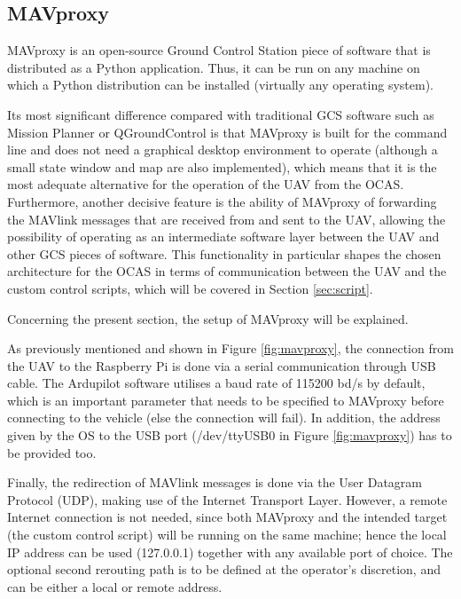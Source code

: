 \subsection{MAVproxy} \label{sec:mavproxy}

MAVproxy is an open-source Ground Control Station piece of software that is distributed as a Python application.
Thus, it can be run on any machine on which a Python distribution can be installed (virtually any operating system).

Its most significant difference compared with traditional GCS software such as Mission Planner or QGroundControl is that MAVproxy is built for the command line and does not need a graphical desktop environment to operate (although a small state window and map are also implemented), which means that it is the most adequate alternative for the operation of the UAV from the OCAS.
Furthermore, another decisive feature is the ability of MAVproxy of forwarding the MAVlink messages that are received from and sent to the UAV, allowing the possibility of operating as an intermediate software layer between the UAV and other GCS pieces of software.
This functionality in particular shapes the chosen architecture for the OCAS in terms of communication between the UAV and the custom control scripts, which will be covered in Section \ref{sec:script}.

Concerning the present section, the setup of MAVproxy will be explained.



As previously mentioned and shown in Figure \ref{fig:mavproxy}, the connection from the UAV to the Raspberry Pi is done via a serial communication through USB cable.
The Ardupilot software utilises a baud rate of 115200 bd/s by default, which is an important parameter that needs to be specified to MAVproxy before connecting to the vehicle (else the connection will fail).
In addition, the address given by the OS to the USB port (/dev/ttyUSB0 in Figure \ref{fig:mavproxy}) has to be provided too. 

Finally, the redirection of MAVlink messages is done via the User Datagram Protocol (UDP), making use of the Internet Transport Layer.
However, a remote Internet connection is not needed, since both MAVproxy and the intended target (the custom control script) will be running on the same machine; hence the local IP address can be used (127.0.0.1) together with any available port of choice.
The optional second rerouting path is to be defined at the operator's discretion, and can be either a local or remote address.

